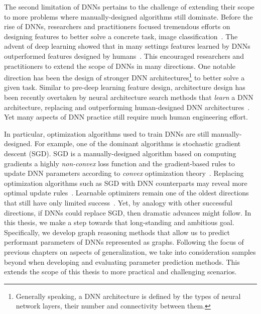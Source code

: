 The second limitation of DNNs pertains to the challenge of extending their scope to more problems where manually-designed algorithms still dominate. Before the rise of DNNs, researchers and practitioners focused tremendous efforts on designing features to better solve a concrete task, \eg image classification~\citep{lowe2004distinctive}. The advent of deep learning showed that in many settings features learned by DNNs outperformed features designed by humans~\citep{krizhevsky2012imagenet}. This encouraged researchers and practitioners to extend the scope of DNNs in many directions. One notable direction has been the design of stronger DNN architectures\footnote{Generally speaking, a DNN architecture is defined by the types of neural network layers, their number and connectivity between them.} to better solve a given task. Similar to pre-deep learning feature design, architecture design has been recently overtaken by neural architecture search methods that \emph{learn} a DNN architecture, replacing and outperforming human-designed DNN architectures~\citep{zoph2016neural,liu2018darts,ren2020comprehensive}.
Yet many aspects of DNN practice still require much human engineering effort. 


In particular, optimization algorithms used to train DNNs are still manually-designed.
For example, one of the dominant algorithms is stochastic gradient descent (SGD). SGD is a manually-designed algorithm based on computing gradients \wrt a highly \textit{non-convex} loss function and the gradient-based rules to update DNN parameters according to \textit{convex} optimization theory~\citep{jain2017non}. Replacing optimization algorithms such as SGD with DNN counterparts may reveal more optimal update rules~\citep{andrychowicz2016learning}. Learnable optimizers remain one of the oldest directions that still have only limited success~\citep{schmidhubermetalearning,metz2020tasks}.
Yet, by analogy with other successful directions, if DNNs could replace SGD, then dramatic advances might follow. In this thesis, we make a step towards that long-standing and ambitious goal. Specifically, we develop graph reasoning methods that allow us to predict performant parameters of DNNs represented as graphs. Following the focus of previous chapters on aspects of generalization, we take into consideration samples beyond \IID when developing and evaluating parameter prediction methods. This extends the scope of this thesis to more practical and challenging scenarios.
